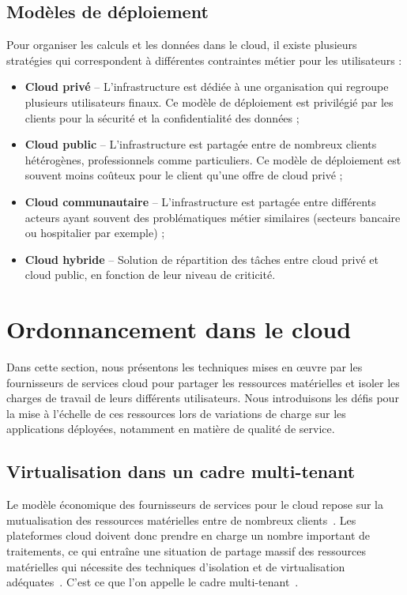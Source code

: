 \subsection{Modèles de déploiement}

Pour organiser les calculs et les données dans le cloud, il existe plusieurs stratégies qui correspondent à différentes contraintes métier pour les utilisateurs :

\begin{itemize}
    \item \textbf{Cloud privé} -- L'infrastructure est dédiée à une organisation qui regroupe plusieurs utilisateurs finaux. Ce modèle de déploiement est privilégié par les clients pour la sécurité et la confidentialité des données ;
    \item \textbf{Cloud public} -- L'infrastructure est partagée entre de nombreux clients hétérogènes, professionnels comme particuliers. Ce modèle de déploiement est souvent moins coûteux pour le client qu'une offre de cloud privé ;
    \item \textbf{Cloud communautaire} -- L'infrastructure est partagée entre différents acteurs ayant souvent des problématiques métier similaires (secteurs bancaire ou hospitalier par exemple) ;
    \item \textbf{Cloud hybride} -- Solution de répartition des tâches entre cloud privé et cloud public, en fonction de leur niveau de criticité.
\end{itemize}

\section{Ordonnancement dans le cloud}

Dans cette section, nous présentons les techniques mises en œuvre par les fournisseurs de services cloud pour partager les ressources matérielles et isoler les charges de travail de leurs différents utilisateurs. Nous introduisons les défis pour la mise à l'échelle de ces ressources lors de variations de charge sur les applications déployées, notamment en matière de qualité de service.

\subsection{Virtualisation dans un cadre multi-tenant}
\label{section:background-virtualization}

Le modèle économique des fournisseurs de services pour le cloud repose sur la mutualisation des ressources matérielles entre de nombreux clients~\cite{hayesCloudComputing2008}. Les plateformes cloud doivent donc prendre en charge un nombre important de traitements, ce qui entraîne une situation de partage massif des ressources matérielles qui nécessite des techniques d'isolation et de virtualisation adéquates~\cite{vaqueroLockingSkySurvey2011}. C'est ce que l'on appelle le cadre multi-tenant~\cite{weissmanDesignForceCom2009}.

